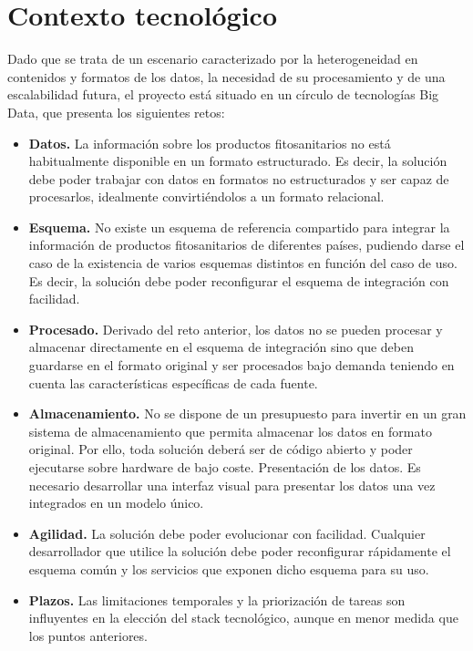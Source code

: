 \section{Contexto tecnológico}
Dado que se trata de un escenario caracterizado por la heterogeneidad en contenidos y formatos de los datos, la necesidad de su procesamiento y de una escalabilidad futura, el proyecto está situado en un círculo de tecnologías Big Data, que presenta los siguientes retos:
\begin{itemize}
\item \textbf{Datos.} La información sobre los productos fitosanitarios no está habitualmente disponible en un formato estructurado. Es decir, la solución debe poder trabajar con datos en formatos no estructurados y ser capaz de procesarlos, idealmente convirtiéndolos a un formato relacional.
\item \textbf{Esquema.} No existe un esquema de referencia compartido para integrar la información de productos fitosanitarios de diferentes países, pudiendo darse el caso de la existencia de varios esquemas distintos en función del caso de uso. Es decir, la solución debe poder reconfigurar el esquema de integración con facilidad.
\item \textbf{Procesado.} Derivado del reto anterior, los datos no se pueden procesar y almacenar directamente en el esquema de integración sino que  deben guardarse en el formato original y ser procesados bajo demanda teniendo en cuenta las características específicas de cada fuente.
\item \textbf{Almacenamiento.} No se dispone de un presupuesto para invertir en un gran sistema de almacenamiento que permita almacenar los datos en formato original. Por ello, toda solución deberá ser de código abierto y poder ejecutarse sobre hardware de bajo coste.
Presentación de los datos. Es necesario desarrollar una interfaz visual para presentar los datos una vez integrados en un modelo único. 
\item  \textbf{Agilidad.} La solución debe poder evolucionar con facilidad. Cualquier desarrollador que utilice la solución debe poder reconfigurar rápidamente el esquema común y los servicios que exponen dicho esquema para su uso.
\item \textbf{Plazos.} Las limitaciones temporales y la priorización de tareas son influyentes en la elección del stack tecnológico, aunque en menor medida que los puntos anteriores. 
\end{itemize}

